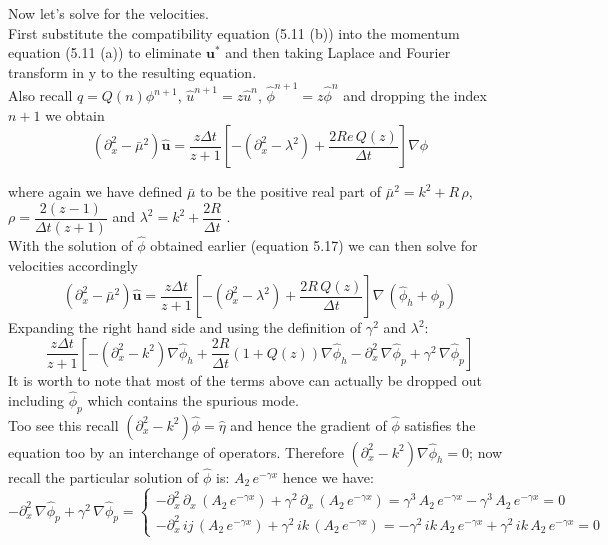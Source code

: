 Now let's solve for the velocities.\\
First substitute the compatibility equation (5.11 (b)) into the momentum equation (5.11 (a)) to eliminate $\textbf{u}^*$ and then taking Laplace and Fourier transform in y to the resulting equation.\\
Also recall $q = Q(n)\phi^{n+1}$, $\hat{u}^{n+1} = z \hat{u}^n$, $\hat{\phi}^{n+1} = z \hat{\phi}^n$ and dropping the index $n+1$ we obtain \\

\begin{equation}
(\partial_x^2 - \bar{\mu}^2) \hat{\textbf{u}} = \dfrac{z \Delta t}{z + 1} [- (\partial_x^2 - \lambda^2) + \dfrac{2 Re \, Q(z)}{\Delta t}] \nabla \hat{\phi}
\end{equation}

where again we have defined $\bar{\mu}$ to be the positive real part of $\bar{\mu}^2 = k^2 + R \, \rho$, $\rho = \dfrac{2(z - 1)}{\Delta t (z + 1)}$ and $\lambda^2 = k^2 + \dfrac{2 R}{\Delta t}$ \cite{brown2001accurate}.\\

With the solution of $\hat{\phi}$ obtained earlier (equation 5.17) we can then solve for velocities accordingly
\begin{equation}
(\partial_x^2 - \bar{\mu}^2) \hat{\textbf{u}} = \dfrac{z \Delta t}{z + 1} [- (\partial_x^2 - \lambda^2) + \dfrac{2 R \, Q(z)}{\Delta t}] \nabla \,(\hat{\phi}_h + \hat{\phi}_p)
\end{equation}
Expanding the right hand side and using the definition of $\gamma^2$ and $\lambda^2$:
\begin{equation*}
\dfrac{z \Delta t}{z + 1} [- (\partial_x^2 - k^2) \nabla \hat{\phi}_h + \dfrac{2R}{\Delta t}(1+Q(z)) \nabla \hat{\phi}_h - \partial_x^2\,\nabla \hat{\phi}_p + \gamma^2\,\nabla \hat{\phi}_p] 
\end{equation*}
It is worth to note that most of the terms above can actually be dropped out including $\hat{\phi}_p$ which contains the spurious mode.\\
Too see this recall $(\partial_x^2 - k^2)\hat{\phi} = \hat{\eta}$ and hence the gradient of $\hat{\phi}$ satisfies the equation too by an interchange of operators. Therefore $(\partial_x^2 - k^2) \nabla \hat{\phi}_h =0$; now recall the particular solution of $\hat{\phi}$ is: $A_2 \,e^{-\gamma x}$ hence we have:
\begin{equation*}
- \partial_x^2\,\nabla \hat{\phi}_p + \gamma^2\,\nabla \hat{\phi}_p = 
\begin{cases}
-\partial_x^2\,\partial_x \,(A_2 \,e^{-\gamma x}) + \gamma^2\,\partial_x\,(A_2 \,e^{-\gamma x})
= \gamma^3\,A_2 \,e^{-\gamma x} - \gamma^3\,A_2 \,e^{-\gamma x} = 0\\
-\partial_x^2\,ij \,(A_2 \,e^{-\gamma x}) + \gamma^2\,ik\,(A_2 \,e^{-\gamma x})
= -\gamma^2 \,ik\,A_2 \,e^{-\gamma x} + \gamma^2\,ik\,A_2 \,e^{-\gamma x} = 0
\end{cases}
\end{equation*}

